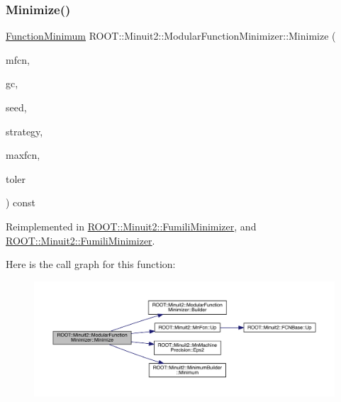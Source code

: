 \subsubsection{\texorpdfstring{Minimize()}{Minimize()}\hspace{0.1cm}{\footnotesize\ttfamily [22/22]}}
{\footnotesize\ttfamily \mbox{\hyperlink{classROOT_1_1Minuit2_1_1FunctionMinimum}{Function\+Minimum}} R\+O\+O\+T\+::\+Minuit2\+::\+Modular\+Function\+Minimizer\+::\+Minimize (\begin{DoxyParamCaption}\item[{const \mbox{\hyperlink{classROOT_1_1Minuit2_1_1MnFcn}{Mn\+Fcn}} \&}]{mfcn,  }\item[{const \mbox{\hyperlink{classROOT_1_1Minuit2_1_1GradientCalculator}{Gradient\+Calculator}} \&}]{gc,  }\item[{const \mbox{\hyperlink{classROOT_1_1Minuit2_1_1MinimumSeed}{Minimum\+Seed}} \&}]{seed,  }\item[{const \mbox{\hyperlink{classROOT_1_1Minuit2_1_1MnStrategy}{Mn\+Strategy}} \&}]{strategy,  }\item[{unsigned int}]{maxfcn,  }\item[{double}]{toler }\end{DoxyParamCaption}) const\hspace{0.3cm}{\ttfamily [virtual]}}



Reimplemented in \mbox{\hyperlink{classROOT_1_1Minuit2_1_1FumiliMinimizer_ace396e586a17ad934f18b32c8ddd054a}{R\+O\+O\+T\+::\+Minuit2\+::\+Fumili\+Minimizer}}, and \mbox{\hyperlink{classROOT_1_1Minuit2_1_1FumiliMinimizer_ace396e586a17ad934f18b32c8ddd054a}{R\+O\+O\+T\+::\+Minuit2\+::\+Fumili\+Minimizer}}.

Here is the call graph for this function\+:\nopagebreak
\begin{figure}[H]
\begin{center}
\leavevmode
\includegraphics[width=350pt]{d3/dc8/classROOT_1_1Minuit2_1_1ModularFunctionMinimizer_ac2b4ce9fa735f5014f610fd0374c58e4_cgraph}
\end{center}
\end{figure}
\mbox{\label{classROOT_1_1Minuit2_1_1ModularFunctionMinimizer_a742930de97b0ce9ba23773874ae0894b}} 
